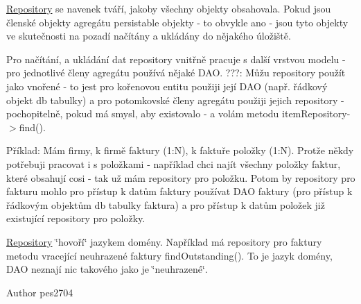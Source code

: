 \mbox{\hyperlink{namespace_pes_1_1_repository}{Repository}} se navenek tváří, jakoby všechny objekty obsahovala. Pokud jsou členské objekty agregátu persistable objekty -\/ to obvykle ano -\/ jsou tyto objekty ve skutečnosti na pozadí načítány a ukládány do nějakého úložiště.

Pro načítání, a ukládání dat repository vnitřně pracuje s další vrstvou modelu -\/ pro jednotlivé členy agregátu používá nějaké D\+AO. ???\+: Můžu repository použít jako vnořené -\/ to jest pro kořenovou entitu použiji její D\+AO (např. řádkový objekt db tabulky) a pro potomkovské členy agregátu použiji jejich repository -\/ pochopitelně, pokud má smysl, aby existovalo -\/ a volám metodu item\+Repository-\/$>$find().

Příklad\+: Mám firmy, k firmě faktury (1\+:N), k faktuře položky (1\+:N). Protže někdy potřebuji pracovat i s položkami -\/ například chci najít všechny položky faktur, které obsahují cosi -\/ tak už mám repository pro položku. Potom by repository pro fakturu mohlo pro přístup k datům faktury používat D\+AO faktury (pro přístup k řádkovým objektům db tabulky faktura) a pro přístup k datům položek již existující repository pro položky.

\mbox{\hyperlink{namespace_pes_1_1_repository}{Repository}} \char`\"{}hovoří\char`\"{} jazykem domény. Například má repository pro faktury metodu vracející neuhrazené faktury find\+Outstanding(). To je jazyk domény, D\+AO neznají nic takového jako je \char`\"{}neuhrazené\char`\"{}. \begin{DoxyAuthor}{Author}
pes2704 
\end{DoxyAuthor}
